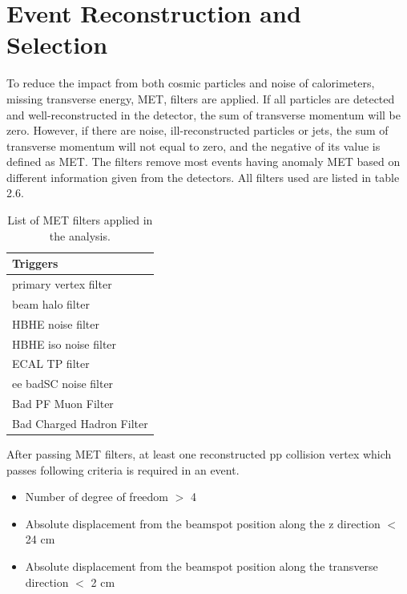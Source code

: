 \section{Event Reconstruction and Selection} \label{Event reconstruction and selection}
To reduce the impact from both cosmic particles and noise of calorimeters, missing transverse energy, MET, filters are applied.
If all particles are detected and well-reconstructed in the detector, the sum of transverse momentum will be zero. However, if there are noise, ill-reconstructed particles or jets, the sum of transverse momentum will not equal to zero, and the negative of its value is defined as MET.  
The filters remove most events having anomaly MET based on different information given from the detectors. All filters used are listed in table 2.6. %
\begin{table}[h!]
  \begin{center}
    \begin{tabular}{l}
    Triggers \\
    \hline
    primary vertex filter\\
    beam halo filter\\
    HBHE noise filter\\
    HBHE iso noise filter\\
    ECAL TP filter\\
    ee badSC noise filter\\
	Bad PF Muon Filter\\
	Bad Charged Hadron Filter\\ 
    \hline
    \end{tabular}
  \end{center}

  \caption{List of MET filters applied in the analysis.}
\end{table}

After passing MET filters, at least one reconstructed pp collision vertex which passes following criteria is required in an event.
\begin{itemize}[noitemsep]
\item Number of degree of freedom $>$ 4
\item Absolute displacement from the beamspot position along the z direction $<$ 24 cm
\item Absolute displacement from the beamspot position along the transverse direction $<$ 2 cm
\end{itemize}


